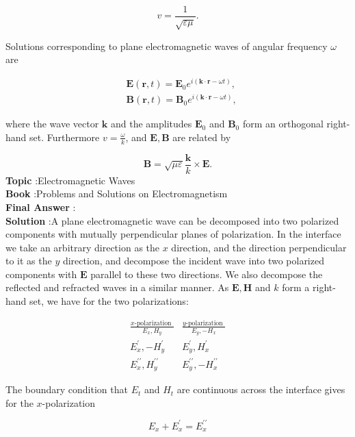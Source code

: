 \documentclass[10pt]{article}
\begin{document}
$$
v=\frac{1}{\sqrt{\varepsilon \mu}} .
$$

Solutions corresponding to plane electromagnetic waves of angular frequency $\omega$ are

$$
\begin{aligned}
&\mathbf{E}(\mathbf{r}, t)=\mathbf{E}_{0} e^{i(\mathbf{k} \cdot \mathbf{r}-\omega t)}, \\
&\mathbf{B}(\mathbf{r}, t)=\mathbf{B}_{0} e^{i(\mathbf{k} \cdot \mathbf{r}-\omega t)},
\end{aligned}
$$

where the wave vector $\mathbf{k}$ and the amplitudes $\mathbf{E}_{0}$ and $\mathbf{B}_{0}$ form an orthogonal right-hand set. Furthermore $v=\frac{\omega}{k}$, and $\mathbf{E}, \mathbf{B}$ are related by

$$
\mathbf{B}=\sqrt{\mu \varepsilon} \frac{\mathbf{k}}{k} \times \mathbf{E} .
$$
\textbf{Topic} :Electromagnetic Waves\\
\textbf{Book} :Problems and Solutions on Electromagnetism\\
\textbf{Final Answer} :\sqrt{\mu \varepsilon}  \times {}\\


\textbf{Solution} :A plane electromagnetic wave can be decomposed into two polarized components with mutually perpendicular planes of polarization. In the interface we take an arbitrary direction as the $x$ direction, and the direction perpendicular to it as the $y$ direction, and decompose the incident wave into two polarized components with $\mathbf{E}$ parallel to these two directions. We also decompose the reflected and refracted waves in a similar manner. As $\mathbf{E}, \mathbf{H}$ and $k$ form a right-hand set, we have for the two polarizations:

$$
\begin{array}{cc}
\frac{x \text {-polarization }}{E_{x}, H_{y}} & \frac{y \text {-polarization }}{E_{y},-H_{x}} \\
E_{x}^{\prime},-H_{y}^{\prime} & E_{y}^{\prime}, H_{x}^{\prime} \\
E_{x}^{\prime \prime}, H_{y}^{\prime \prime} & E_{y}^{\prime \prime},-H_{x}^{\prime \prime}
\end{array}
$$

The boundary condition that $E_{t}$ and $H_{t}$ are continuous across the interface gives for the $x$-polarization

$$
E_{x}+E_{x}^{\prime}=E_{x}^{\prime \prime}
$$
\end{document}

